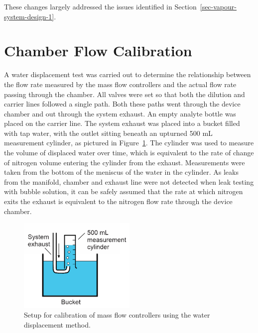 \documentclass[
  a4paper,
]{scrbook}
\begin{document}
These changes largely addressed the issues identified in
Section~\ref{sec-vapour-system-design-1}.

\hypertarget{sec-calibration}{%
\section{Chamber Flow Calibration}\label{sec-calibration}}

A water displacement test was carried out to determine the relationship
between the flow rate measured by the mass flow controllers and the
actual flow rate passing through the chamber. All valves were set so
that both the dilution and carrier lines followed a single path. Both
these paths went through the device chamber and out through the system
exhaust. An empty analyte bottle was placed on the carrier line. The
system exhaust was placed into a bucket filled with tap water, with the
outlet sitting beneath an upturned 500 mL measurement cylinder, as
pictured in Figure~\ref{fig-water-displacement}. The cylinder was used
to measure the volume of displaced water over time, which is equivalent
to the rate of change of nitrogen volume entering the cylinder from the
exhaust. Measurements were taken from the bottom of the meniscus of the
water in the cylinder. As leaks from the manifold, chamber and exhaust
line were not detected when leak testing with bubble solution, it can be
safely assumed that the rate at which nitrogen exits the exhaust is
equivalent to the nitrogen flow rate through the device chamber.

\begin{figure}

{\centering \includegraphics[width=0.5\textwidth,height=\textheight]{figures/ch8/water_displacement.png}

}

\caption[Setup for calibration of mass flow controllers using the water
displacement method.]{\label{fig-water-displacement}Setup for
calibration of mass flow controllers using the water displacement
method.}

\end{figure}
\end{document}
